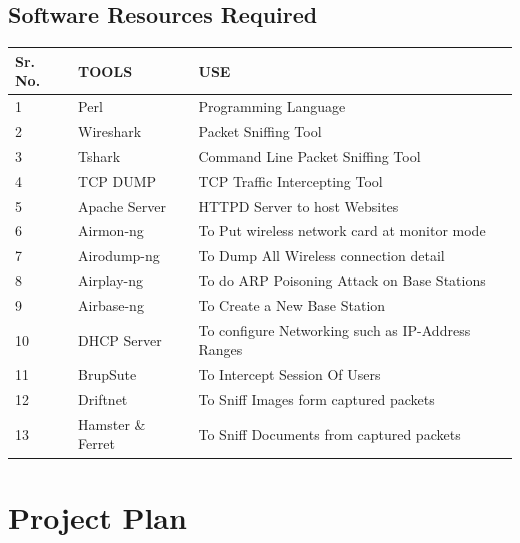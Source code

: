 \documentclass[12pt,a4paper]{report}
\begin{document}
\section{Software Resources Required}
\setlength{\arrayrulewidth}{1mm}
\setlength{\tabcolsep}{12pt}
\begin{tabular}{ |p{3cm}|p{3cm}|p{8cm}|  }
\hline
Sr. No. & TOOLS &USE\\
\hline
 1 &Perl & Programming Language   \\ 
\hline
 2 &Wireshark 	& Packet Sniffing Tool  \\
 \hline
 3 &Tshark &	Command Line Packet Sniffing Tool \\
 \hline
 4 &TCP DUMP &	TCP Traffic Intercepting Tool  \\
 \hline
 5 &Apache Server &	HTTPD Server to host Websites\\ 
 \hline
 6 &Airmon-ng &	To Put wireless network card at monitor mode\\ 
 \hline
 7 &Airodump-ng &	To Dump All Wireless connection detail \\
 \hline
 8 &Airplay-ng 	&	To do ARP Poisoning Attack on Base Stations \\
 \hline
 9 &Airbase-ng 	 & To Create a New Base Station \\
 \hline
 10 &DHCP Server &	To configure Networking such as IP-Address Ranges \\
 \hline
 11 &BrupSute &	To Intercept Session Of Users  \\
 \hline
 12 &Driftnet &	To Sniff Images form captured packets\\
 \hline 
 13 &Hamster \& Ferret &	To Sniff Documents from captured packets \\
 \hline
\end{tabular}

\newpage
\chapter{Project Plan}
\newpage
\end{document}
